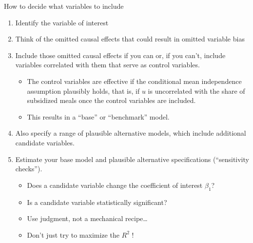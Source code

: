\documentclass[notes,10pt, aspectratio=169]{beamer}
\begin{document}
\begin{frame}{How to decide what variables to include}
\begin{enumerate}
    \item Identify the variable of interest

    \item Think of the omitted causal effects that could result in omitted variable bias

    \item Include those omitted causal effects if you can or, if you can’t, include variables correlated with them that serve as control variables.

    \begin{itemize}
        \item The control variables are effective if the conditional mean independence assumption plausibly holds, that is, if $u$ is uncorrelated with the share of subsidized meals once the control variables are included. 
        \item This results in a “base” or “benchmark” model.
    \end{itemize}

    \item Also specify a range of plausible alternative models, which include additional candidate variables.

    \item Estimate your base model and plausible alternative specifications (“sensitivity checks”).
    \begin{itemize}
        \item Does a candidate variable change the coefficient of interest $\beta_1$?
        \item Is a candidate variable statistically significant?
        \item Use judgment, not a mechanical recipe…
        \item Don’t just try to maximize the $R^2$ !
    \end{itemize}
\end{enumerate}
\end{frame}
\end{document}
